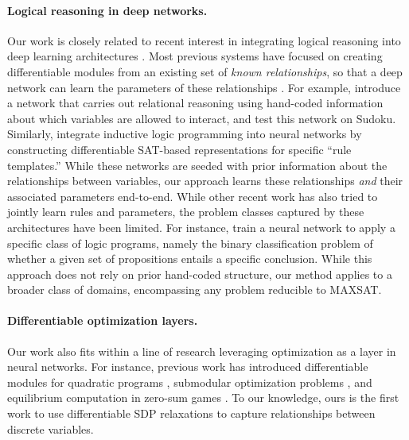 \documentclass{article}
\begin{document}
	\paragraph{Logical reasoning in deep networks.} Our work is closely related to recent interest in integrating logical reasoning into deep learning architectures \cite{garcez2015neural}. 
	Most previous systems have focused on creating differentiable modules from an existing set of \emph{known relationships}, so that a deep network can learn the parameters of these relationships \cite{dai2018tunneling, manhaeve2018deepproblog, sourek2018lifted,xu2018semantic,hu2016harnessing,yang2017differentiable, selsam2018learning}.
	For example, \citet{palm2017recurrent} introduce a network that carries out relational reasoning using hand-coded information about which variables are allowed to interact, and test this network on  Sudoku.
	Similarly, \citet{evans2018learning} integrate inductive logic programming into neural networks by constructing differentiable SAT-based representations for specific ``rule templates.''
	While these networks are seeded with prior information about the relationships between variables, our approach learns these relationships \emph{and} their associated parameters end-to-end.
	While other recent work has also tried to jointly learn rules and parameters, the problem classes captured by these architectures have been limited.
	For instance, \citet{cingillioglu2018deeplogic} train a neural network to apply a specific class of logic programs, namely the binary classification problem of whether a given set of propositions entails a specific conclusion.  
	While this approach does not rely on prior hand-coded structure, our method applies to a broader class of domains, encompassing any problem reducible to MAXSAT. 
	
	\vspace{-5pt}
	\paragraph{Differentiable optimization layers.} Our work also fits within a line of research leveraging optimization as a layer in neural networks. For instance, previous work has introduced differentiable modules for quadratic programs \cite{amos2017optnet,donti2017task}, submodular optimization problems \cite{djolonga2017differentiable,tschiatschek2018differentiable,wilder2018melding}, and equilibrium computation in zero-sum games \cite{ling2018what}. To our knowledge, ours is the first work to use differentiable SDP relaxations to capture relationships between discrete variables.
	
\end{document}
